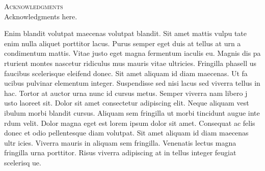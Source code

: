
\noindent
\begin{singlespace}
{\parindent0pt
	{\large \textsc{Acknowledgments}} \\

	Acknowledgments here.

	Enim blandit volutpat maecenas volutpat blandit. Sit amet mattis vulpu
	tate enim nulla aliquet porttitor lacus. Purus semper eget duis at tellus at urn
	a condimentum mattis. Vitae justo eget magna fermentum iaculis eu. Magnis dis pa
	rturient montes nascetur ridiculus mus mauris vitae ultricies. Fringilla phasell
	us faucibus scelerisque eleifend donec. Sit amet aliquam id diam maecenas. Ut fa
	ucibus pulvinar elementum integer. Suspendisse sed nisi lacus sed viverra tellus
	 in hac. Tortor at auctor urna nunc id cursus metus. Semper viverra nam libero j
	usto laoreet sit. Dolor sit amet consectetur adipiscing elit. Neque aliquam vest
	ibulum morbi blandit cursus. Aliquam sem fringilla ut morbi tincidunt augue inte
	rdum velit. Dolor magna eget est lorem ipsum dolor sit amet. Consequat ac felis 
	donec et odio pellentesque diam volutpat. Sit amet aliquam id diam maecenas ultr
	icies. Viverra mauris in aliquam sem fringilla. Venenatis lectus magna fringilla
	 urna porttitor. Risus viverra adipiscing at in tellus integer feugiat scelerisq
	ue.
}

\end{singlespace}

\newpage
\null
\thispagestyle{empty}
\newpage